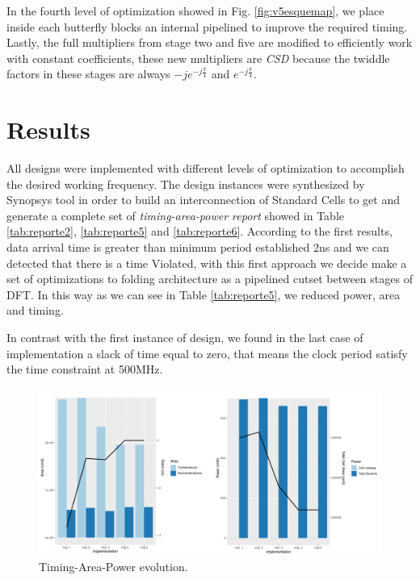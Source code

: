 \documentclass[journal,comsoc]{IEEEtran}
\begin{document}
In the fourth level of optimization showed in Fig. \ref{fig:v5esquemap}, we place inside each butterfly blocks an internal pipelined to improve the required timing. Lastly, the full multipliers from stage two and five are modified to efficiently work with constant coefficients, these new multipliers are \textit{CSD} because the twiddle factors in these stages are always $-je^{-j\frac{\pi}{4}}$ and $e^{-j\frac{\pi}{4}}$.



\section{Results}\label{sec:results}
All designs were implemented with different levels of optimization to accomplish the desired working frequency. The design instances were synthesized by Synopsys tool in order to build an interconnection of Standard Cells to get and generate a complete set of \textit{timing-area-power report} showed in Table \ref{tab:reporte2}, \ref{tab:reporte5} and  \ref{tab:reporte6}. According to the first results, data arrival time is greater than minimum period established 2ns and we can detected that there is a time Violated, with this first approach we decide make a set of optimizations to folding architecture as a pipelined cutset between stages of DFT. In this way as we can see in Table \ref{tab:reporte5}, we reduced power, area and timing. 

In contrast with the first instance of design, we found in the last case of implementation a slack of time equal to zero, that means the clock period satisfy the time constraint at 500MHz.


%
%

	

\begin{figure} 
	\centering
	\includegraphics[width=0.85\linewidth]{Diagramas/areaTiempoPowerArea}
	\caption{Timing-Area-Power evolution.}
	\label{fig:atp}
\end{figure}
\end{document}
